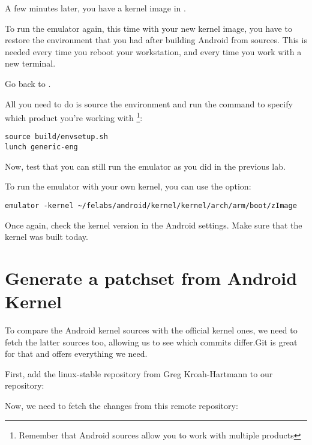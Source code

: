 
A few minutes later, you have a kernel image in .


To run the emulator again, this time with your new kernel image, you
have to restore the environment that you had after building Android from
sources. This is needed every time you reboot your workstation, and every time
you work with a new terminal.

Go back to .

All you need to do is source the environment and run the 
command to specify which product you're working with
\footnote{Remember that Android sources allow you to work with
multiple products}:

\begin{verbatim}
source build/envsetup.sh
lunch generic-eng
\end{verbatim}

Now, test that you can still run the emulator as you did in the
previous lab.

To run the emulator with your own kernel, you can use the 
option:

\begin{verbatim}
emulator -kernel ~/felabs/android/kernel/kernel/arch/arm/boot/zImage
\end{verbatim}

Once again, check the kernel version in the Android settings. Make sure
that the kernel was built today.

\section{Generate a patchset from Android Kernel}

To compare the Android kernel sources with the official kernel ones,
we need to fetch the latter sources too, allowing us to see which 
commits differ.Git is great for that and offers everything we need.

First, add the linux-stable repository from Greg Kroah-Hartmann to our
repository:


Now, we need to fetch the changes from this remote repository:



